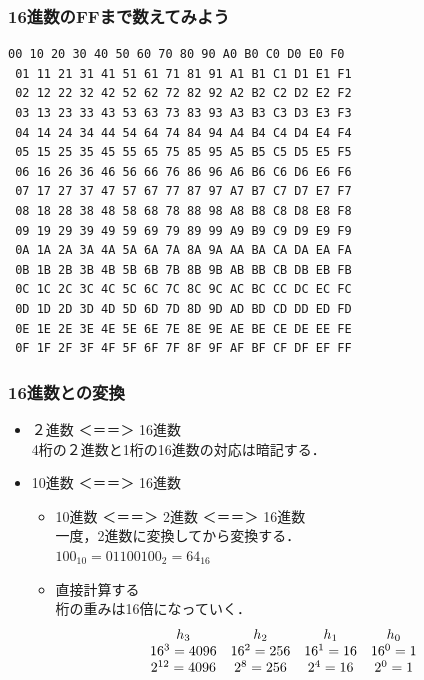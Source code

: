 \documentclass[handout]{beamer}        %
\begin{document}
\begin{frame}[fragile]
  \frametitle{16進数のFFまで数えてみよう}
  \begin{lstlisting}[basicstyle={\ttfamily},frame=none]
 00 10 20 30 40 50 60 70 80 90 A0 B0 C0 D0 E0 F0
 01 11 21 31 41 51 61 71 81 91 A1 B1 C1 D1 E1 F1
 02 12 22 32 42 52 62 72 82 92 A2 B2 C2 D2 E2 F2
 03 13 23 33 43 53 63 73 83 93 A3 B3 C3 D3 E3 F3
 04 14 24 34 44 54 64 74 84 94 A4 B4 C4 D4 E4 F4
 05 15 25 35 45 55 65 75 85 95 A5 B5 C5 D5 E5 F5
 06 16 26 36 46 56 66 76 86 96 A6 B6 C6 D6 E6 F6
 07 17 27 37 47 57 67 77 87 97 A7 B7 C7 D7 E7 F7
 08 18 28 38 48 58 68 78 88 98 A8 B8 C8 D8 E8 F8
 09 19 29 39 49 59 69 79 89 99 A9 B9 C9 D9 E9 F9
 0A 1A 2A 3A 4A 5A 6A 7A 8A 9A AA BA CA DA EA FA
 0B 1B 2B 3B 4B 5B 6B 7B 8B 9B AB BB CB DB EB FB
 0C 1C 2C 3C 4C 5C 6C 7C 8C 9C AC BC CC DC EC FC
 0D 1D 2D 3D 4D 5D 6D 7D 8D 9D AD BD CD DD ED FD
 0E 1E 2E 3E 4E 5E 6E 7E 8E 9E AE BE CE DE EE FE
 0F 1F 2F 3F 4F 5F 6F 7F 8F 9F AF BF CF DF EF FF
  \end{lstlisting}

\end{frame}

\begin{frame}
  \frametitle{16進数との変換}

  \begin{itemize}
  \item ２進数 ＜＝＝＞ 16進数 \\
    4桁の２進数と1桁の16進数の対応は暗記する．
  \item 10進数 ＜＝＝＞ 16進数 \\
    \begin{itemize}
    \item 10進数 ＜＝＝＞ 2進数 ＜＝＝＞ 16進数 \\
      一度，2進数に変換してから変換する．\\
      $100_{10} = 0110 0100_2 = 64_{16}$
    \item 直接計算する \\
      桁の重みは16倍になっていく．
      \[
        \begin{array}{c c c c c }
          h_3     & h_2     & h_1     & h_0     \\
          16^3 = 4096 & 16^2 = 256 & 16^1 = 16 & 16^0 = 1 \\
          2^{12} = 4096 & 2^8 = 256 & 2^4 = 16 & 2^0 = 1 \\
        \end{array}
        \]
    \end{itemize}
  \end{itemize}
\end{frame}
\end{document}
